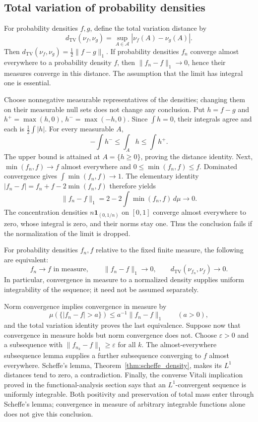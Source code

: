 \subsection{Total variation of probability densities}
\begin{theorem}
\label{thm:scheffe_density}
For probability densities $f,g$, define the total variation distance by
\[
d_{\mathrm{TV}}(\nu_f,\nu_g)
 =\sup_{A\in\mathcal A}|\nu_f(A)-\nu_g(A)|.
\]
Then $d_{\mathrm{TV}}(\nu_f,\nu_g)=\tfrac12\|f-g\|_1$.
If probability densities $f_n$ converge almost everywhere to a probability
density $f$, then $\|f_n-f\|_1\to0$, hence their measures converge in
this distance. The assumption that the limit has integral one is essential.
\end{theorem}
\Proof
Choose nonnegative measurable representatives of the densities; changing
them on their measurable null sets does not change any conclusion.
Put $h=f-g$ and $h^+=\max(h,0)$, $h^-=\max(-h,0)$.
Since $\int h=0$, their integrals agree and each is
$\tfrac12\int|h|$. For every measurable $A$,
\[
-\int h^-\leq\int_A h\leq\int h^+.
\]
The upper bound is attained at $A=\{h\geq0\}$, proving the distance
identity. Next, $\min(f_n,f)\to f$ almost everywhere and
$0\leq\min(f_n,f)\leq f$. Dominated convergence gives
$\int\min(f_n,f)\to1$. The elementary identity
$|f_n-f|=f_n+f-2\min(f_n,f)$ therefore yields
\[
\|f_n-f\|_1=2-2\int\min(f_n,f)\,d\mu\longrightarrow0.
\]
The concentration densities $n\mathbf1_{(0,1/n)}$ on $[0,1]$ converge
almost everywhere to zero, whose integral is zero, and their norms stay
one. Thus the conclusion fails if the normalization of the limit is dropped.
\Done

\begin{corollary}
For probability densities $f_n,f$ relative to the fixed finite measure,
the following are equivalent:
\[
f_n\to f\text{ in measure},\qquad
\|f_n-f\|_1\to0,\qquad
d_{\mathrm{TV}}(\nu_{f_n},\nu_f)\to0.
\]
In particular, convergence in measure to a normalized density supplies
uniform integrability of the sequence; it need not be assumed separately.
\end{corollary}
\Proof
Norm convergence implies convergence in measure by
\[
\mu(\{|f_n-f|>a\})\leq a^{-1}\|f_n-f\|_1\qquad(a>0),
\]
and the total variation identity proves the last equivalence.
Suppose now that convergence in measure holds but norm convergence does
not. Choose $\varepsilon>0$ and a subsequence with
$\|f_{n_k}-f\|_1\geq\varepsilon$ for all $k$. The almost-everywhere
subsequence lemma supplies a further subsequence converging to $f$
almost everywhere. Scheffe's lemma, Theorem~\ref{thm:scheffe_density},
makes its $L^1$ distances tend to zero, a contradiction.
Finally, the converse Vitali implication proved in the functional-analysis
section says that an $L^1$-convergent sequence is uniformly integrable.
Both positivity and preservation of total mass enter through Scheffe's
lemma; convergence in measure of arbitrary integrable functions alone
does not give this conclusion.
\Done

